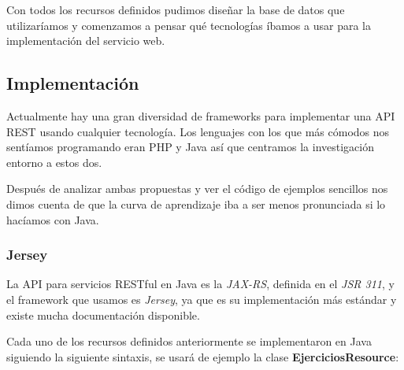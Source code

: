 Con todos los recursos definidos pudimos diseñar la base de datos que utilizaríamos y comenzamos a pensar qué tecnologías íbamos a usar para la implementación del servicio web.

\subsection{Implementación}

Actualmente hay una gran diversidad de frameworks para implementar una API REST usando cualquier tecnología. Los lenguajes con los que más cómodos nos sentíamos programando eran PHP y Java así que centramos la investigación entorno a estos dos.
\vspace{1em}

Después de analizar ambas propuestas y ver el código de ejemplos sencillos nos dimos cuenta de que la curva de aprendizaje iba a ser menos pronunciada si lo hacíamos con Java.


\subsubsection{Jersey}


La API para servicios RESTful en Java es la \textit{JAX-RS}, definida en el \textit{JSR 311}, y el framework que usamos es \textit{Jersey}, ya que es su implementación más estándar y existe mucha documentación disponible.

\vspace{1em}

Cada uno de los recursos definidos anteriormente se implementaron en Java siguiendo la siguiente sintaxis, se usará de ejemplo la clase \textbf{EjerciciosResource}:

